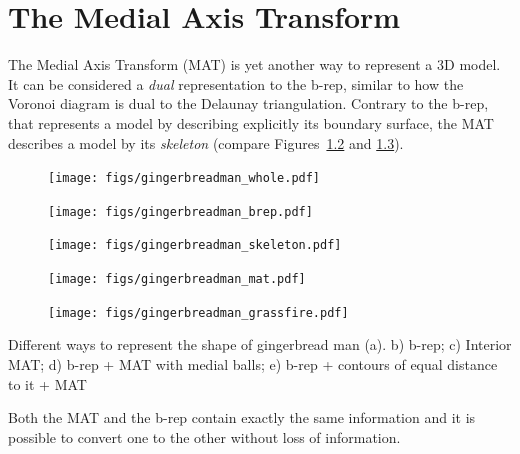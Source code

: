 
\setchapterpreamble[u]{\margintoc}

\graphicspath{{mat/}}
\renewcommand*{\thelesson}{5.2}

\chapter{The Medial Axis Transform}%
\label{chap:mat}

The Medial Axis Transform (MAT) is yet another way to represent a 3D model.
It can be considered a \emph{dual} representation to the b-rep, similar to how the Voronoi diagram is dual to the Delaunay triangulation. 
Contrary to the b-rep, that represents a model by describing explicitly its boundary surface, the MAT describes a model by its \emph{skeleton} (compare Figures~\ref{fig:gbm:brep} and \ref{fig:gbm:maxis}).
\begin{marginfigure}
	\centering
	\begin{subfigure}[b]{0.47\linewidth}
		\centering
		\texttt{[image: figs/gingerbreadman\_whole.pdf]}
		\caption{}
		\label{fig:gbm:whole}
	\end{subfigure}
	\begin{subfigure}[b]{0.47\linewidth}
		\centering
		\texttt{[image: figs/gingerbreadman\_brep.pdf]}
		\caption{}
		\label{fig:gbm:brep}
	\end{subfigure}
	\begin{subfigure}[b]{0.50\linewidth}
		\centering
		\texttt{[image: figs/gingerbreadman\_skeleton.pdf]}
		\caption{}
		\label{fig:gbm:maxis}
	\end{subfigure}
	
	\begin{subfigure}[b]{0.47\linewidth}
		\centering
		\texttt{[image: figs/gingerbreadman\_mat.pdf]}
		\caption{}
		\label{fig:gbm:mballs}
	\end{subfigure}
	\begin{subfigure}[b]{0.47\linewidth}
		\centering
		\texttt{[image: figs/gingerbreadman\_grassfire.pdf]}
		\caption{}
		\label{fig:gbm:dt}
	\end{subfigure}
	
	\caption{Different ways to represent the shape of gingerbread man (a). b) b-rep; c) Interior MAT; d) b-rep + MAT with medial balls; e) b-rep + contours of equal distance to it + MAT}
	\label{fig:gingerman}
\end{marginfigure}
Both the MAT and the b-rep contain exactly the same information and it is possible to convert one to the other without loss of information.

